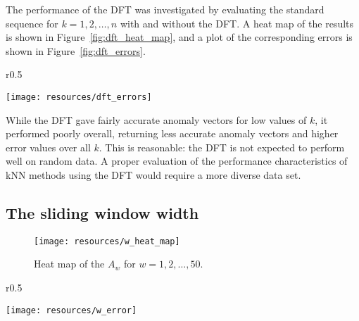 The performance of the DFT was investigated by evaluating the standard sequence for $k = 1,2,\dots, n$ with and without the DFT\@. A heat map of the results is shown in Figure~\ref{fig:dft_heat_map}, and a plot of the corresponding errors is shown in Figure~\ref{fig:dft_errors}.

\begin{wrapfigure}{r}{0.5\textwidth}
    \vspace{-30pt}
    \begin{center}
        \texttt{[image: resources/dft\_errors]}
    \end{center}
    \vspace{-20pt}
    \caption{\small{Errors of the $A_{k, t}$.}}
    \vspace{-10pt}
\label{fig:dft_errors}
\end{wrapfigure}

While the DFT gave fairly accurate anomaly vectors for low values of $k$, it performed poorly overall, returning less accurate anomaly vectors and higher error values over all $k$. This is reasonable: the DFT is not expected to perform well on random data. A proper evaluation of the performance characteristics of kNN methods using the DFT would require a more diverse data set.

\clearpage

\subsection{The sliding window width}
\FloatBarrier{}
\label{sect:w}

\begin{figure}[h]
    \vspace{-15pt}
    \begin{center}
        \texttt{[image: resources/w\_heat\_map]}
    \end{center}
    \vspace{-20pt}
    \caption{\small{Heat map of the $A_w$ for $w = 1, 2, \dots, 50$.}}
    \vspace{-10pt}
\label{fig:w_heat_map}
\end{figure}

\begin{wrapfigure}{r}{0.5\textwidth}
    \vspace{-20pt}
    \begin{center}
        \texttt{[image: resources/w\_error]}
    \end{center}
    \vspace{-20pt}
    \caption{\small{Errors for the anomaly vectors $A_w$.}}
\label{fig:w_error}
    \vspace{-20pt}
\end{wrapfigure}

